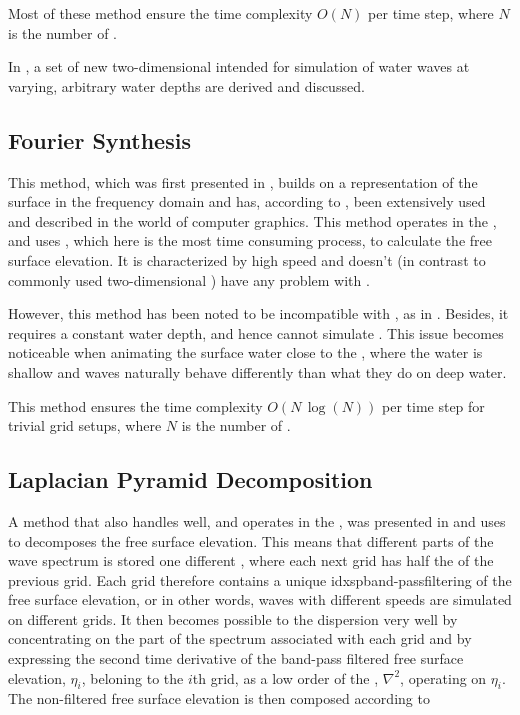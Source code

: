 Most of these method ensure the time complexity $O(N)$ per time step, where $N$ is the number of .

In , a set of new two-dimensional \PDEs intended for simulation of water waves at varying, arbitrary water depths are derived and discussed.

\subsection{Fourier Synthesis}

This method, which was first presented in \citep{Mastin1987}, builds on  a representation of the surface in the frequency domain and has, according to \citep{Monnier}, been extensively used and described in the world of computer graphics. This method operates in the , and uses \FFT, which here is the most time consuming process, to calculate the free surface elevation. It is characterized by high speed and doesn't (in contrast to commonly used two-dimensional \PDEs) have any problem with .

However, this method has been noted to be incompatible with \FSI, as in \citep{Chentanez2011a}. Besides, it requires a constant water depth, and hence cannot simulate . This issue becomes noticeable when animating the surface water close to the , where the water is shallow and waves naturally behave differently than what they do on deep water.

This method ensures the time complexity $O(N\,\log(N))$ per time step for trivial grid setups, where $N$ is the number of .

\subsection{Laplacian Pyramid Decomposition}

A method that also handles  well, and operates in the , was presented in \citep{Ottosson2011} and uses \LPD to decomposes the free surface elevation. This means that different parts of the wave spectrum is stored one different \grids, where each next grid has half the \resolution of the previous grid. Each grid therefore contains a unique idxsp{band-pass}{filter}{ing} of the free surface elevation, or in other words, waves with different speeds are simulated on different grids. It then becomes possible to \approximate the dispersion very well by concentrating on the part of the spectrum associated with each grid and by expressing the second time derivative of the band-pass filtered free surface elevation, $\eta_i$, beloning to the $i$th grid, as a low order \polynomial of the , $\nabla^2$, operating on $\eta_i$. The non-filtered free surface elevation is then composed according to

